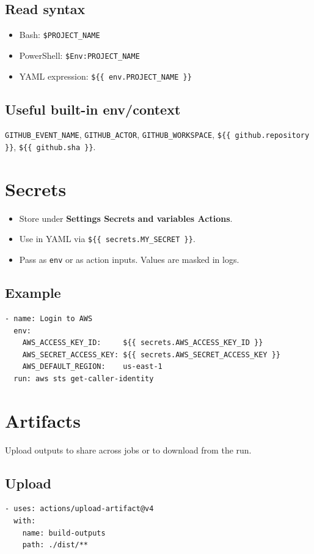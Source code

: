 \documentclass[11pt]{article}
\begin{document}
\subsection{Read syntax}
\begin{itemize}
  \item Bash: \texttt{\$PROJECT\_NAME}
  \item PowerShell: \texttt{\$Env:PROJECT\_NAME}
  \item YAML expression: \texttt{\$\{\{ env.PROJECT\_NAME \}\}}
\end{itemize}

\subsection{Useful built-in env/context}
\texttt{GITHUB\_EVENT\_NAME}, \texttt{GITHUB\_ACTOR}, \texttt{GITHUB\_WORKSPACE}, \texttt{\$\{\{ github.repository \}\}}, \texttt{\$\{\{ github.sha \}\}}.
\clearpage

\section{Secrets}
\begin{itemize}
  \item Store under \textbf{Settings \textrightarrow{} Secrets and variables \textrightarrow{} Actions}.
  \item Use in YAML via \texttt{\$\{\{ secrets.MY\_SECRET \}\}}.
  \item Pass as \texttt{env} or as action inputs. Values are masked in logs.
\end{itemize}

\subsection{Example}
\begin{verbatim}
- name: Login to AWS
  env:
    AWS_ACCESS_KEY_ID:     ${{ secrets.AWS_ACCESS_KEY_ID }}
    AWS_SECRET_ACCESS_KEY: ${{ secrets.AWS_SECRET_ACCESS_KEY }}
    AWS_DEFAULT_REGION:    us-east-1
  run: aws sts get-caller-identity
\end{verbatim}

\section{Artifacts}
Upload outputs to share across jobs or to download from the run.
\subsection{Upload}
\begin{verbatim}
- uses: actions/upload-artifact@v4
  with:
    name: build-outputs
    path: ./dist/**
\end{verbatim}
\end{document}
